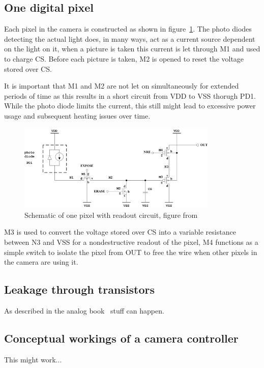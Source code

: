 
\subsection{One digital pixel}


Each pixel in the camera is constructed as shown in figure~\ref{fig:pixelschematic}.
The photo diodes detecting the actual light does, in many ways, act as a current source dependent on the light on it, when a picture is taken this
current is let through M1 and used to charge CS.
Before each picture is taken, M2 is opened to reset the voltage stored over CS.

It is important that M1 and M2 are not let on simultaneously for extended periods of time as this results in a short circuit from VDD to VSS thorugh PD1.
While the photo diode limits the current, this still might lead to excessive power usage and subsequent heating issues over time.


\begin{figure}[htbp]
  \centering
  \includegraphics[width=0.85\textwidth]{figures/pixel}
  \caption{Schematic of one pixel with readout circuit, figure from~\cite{oppgave}}
  \label{fig:pixelschematic}
\end{figure}


M3 is used to convert the voltage stored over CS into a variable resistance between N3 and VSS for a nondestructive readout of the pixel,
M4 functions as a simple switch to isolate the pixel from OUT to free the wire when other pixels in the camera are using it.



\subsection{Leakage through transistors}

As described in the analog book~\cite{AnalogBook} stuff can happen.

\subsection{Conceptual workings of a camera controller}

This might work...